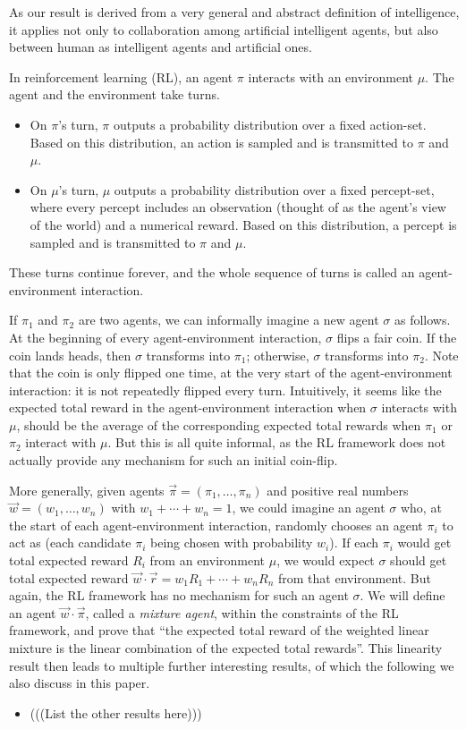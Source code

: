 \documentclass[twoside]{article}
\begin{document}
As our result is derived from a very general and abstract definition of intelligence, it applies not only to collaboration among artificial intelligent agents, but also between human as intelligent agents and artificial ones.

In reinforcement learning (RL), an agent $\pi$ interacts with an environment $\mu$.
The agent and the environment take turns.
\begin{itemize}
\item
On $\pi$'s turn, $\pi$
outputs a probability distribution over a fixed action-set.
Based on this distribution, an action is sampled
and is transmitted to $\pi$ and $\mu$.
\item
On $\mu$'s turn, $\mu$
outputs a probability distribution over a fixed percept-set,
where every percept includes an observation (thought of as
the agent's view of the world) and a numerical reward.
Based on this distribution, a percept is sampled and
is transmitted to $\pi$ and $\mu$.
\end{itemize}
These turns continue forever, and the whole sequence of turns
is called an agent-environment interaction.

If $\pi_1$ and $\pi_2$ are two agents, we can informally imagine a new agent
$\sigma$
as follows. At the beginning of every agent-environment interaction,
$\sigma$ flips a fair coin. If the coin lands heads, then $\sigma$ transforms into
$\pi_1$; otherwise, $\sigma$ transforms into $\pi_2$. Note that the coin is only
flipped one time, at the very start of the agent-environment interaction:
it is not repeatedly flipped every turn. Intuitively, it seems like the
expected total reward in the agent-environment interaction
when $\sigma$ interacts with $\mu$, should be the average
of the corresponding expected total rewards when $\pi_1$ or $\pi_2$ interact
with $\mu$. But this is all quite informal, as the RL
framework does not actually provide any mechanism for such an initial
coin-flip.

More generally, given agents $\vec{\pi}=(\pi_1,\ldots,\pi_n)$ and positive real
numbers
$\vec{w}=(w_1,\ldots,w_n)$ with $w_1+\cdots+w_n=1$, we could imagine an agent $\sigma$
who, at the start of each agent-environment interaction, randomly chooses
an agent $\pi_i$ to act as (each candidate $\pi_i$ being chosen with probability
$w_i$). If each $\pi_i$ would get total expected reward $R_i$ from an environment
$\mu$, we would expect $\sigma$ should get total expected reward
$\vec{w}\cdot \vec{r}=w_1R_1+\cdots+w_nR_n$ from that environment.
But again, the RL
framework has no mechanism for such an agent $\sigma$. We will define
an agent $\vec{w}\cdot\vec{\pi}$, called a \emph{mixture agent},
within the constraints
of the RL framework, and prove that ``the expected total reward of the
weighted linear mixture is the linear combination of the expected total rewards''.
This linearity result then leads to multiple further interesting results, of which the following we also discuss in this paper.
\begin{itemize}
    \item (((List the other results here)))
\end{itemize}
\end{document}
